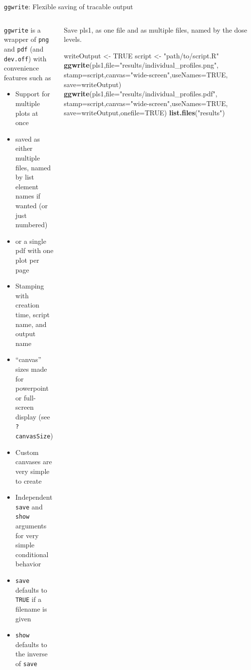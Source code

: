 \documentclass[
  8pt,
  ignorenonframetext,
  aspectratio=169]{beamer}
\newenvironment{Shaded}{\begin{snugshade}}{\end{snugshade}}
\newcommand{\DataTypeTok}[1]{\textcolor[rgb]{0.13,0.29,0.53}{#1}}
\newcommand{\KeywordTok}[1]{\textcolor[rgb]{0.13,0.29,0.53}{\textbf{#1}}}
\newcommand{\NormalTok}[1]{#1}
\newcommand{\OtherTok}[1]{\textcolor[rgb]{0.56,0.35,0.01}{#1}}
\newcommand{\StringTok}[1]{\textcolor[rgb]{0.31,0.60,0.02}{#1}}
\providecommand{\tightlist}{%
  \setlength{\itemsep}{0pt}\setlength{\parskip}{0pt}}
\begin{document}
\begin{frame}[fragile]{\texttt{ggwrite}: Flexible saving of tracable
output}
\protect\hypertarget{ggwrite-flexible-saving-of-tracable-output}{}
\begin{columns}[T]
\begin{column}{0.48\textwidth}
\texttt{ggwrite} is a wrapper of \texttt{png} and \texttt{pdf} (and
\texttt{dev.off}) with convenience features such as

\begin{itemize}
\tightlist
\item
  Support for multiple plots at once
\item
  saved as either multiple files, named by list element names if wanted
  (or just numbered)
\item
  or a single pdf with one plot per page
\item
  Stamping with creation time, script name, and output name
\item
  ``canvas'' sizes made for powerpoint or full-screen display (see
  \texttt{?canvasSize})
\item
  Custom canvases are very simple to create
\item
  Independent \texttt{save} and \texttt{show} arguments for very simple
  conditional behavior
\item
  \texttt{save} defaults to \texttt{TRUE} if a filename is given
\item
  \texttt{show} defaults to the inverse of \texttt{save}
\end{itemize}
\end{column}

\begin{column}{0.48\textwidth}
Save pls1, as one file and as multiple files, named by the dose levels.
\footnotesize

\begin{Shaded}
\begin{Highlighting}[]
\NormalTok{writeOutput \textless{}{-}}\StringTok{ }\OtherTok{TRUE}
\NormalTok{script \textless{}{-}}\StringTok{ "path/to/script.R"}
\KeywordTok{ggwrite}\NormalTok{(pls1,}\DataTypeTok{file=}\StringTok{"results/individual\_profiles.png"}\NormalTok{,}
        \DataTypeTok{stamp=}\NormalTok{script,}\DataTypeTok{canvas=}\StringTok{"wide{-}screen"}\NormalTok{,}\DataTypeTok{useNames=}\OtherTok{TRUE}\NormalTok{,}
        \DataTypeTok{save=}\NormalTok{writeOutput)}
\KeywordTok{ggwrite}\NormalTok{(pls1,}\DataTypeTok{file=}\StringTok{"results/individual\_profiles.pdf"}\NormalTok{,}
        \DataTypeTok{stamp=}\NormalTok{script,}\DataTypeTok{canvas=}\StringTok{"wide{-}screen"}\NormalTok{,}\DataTypeTok{useNames=}\OtherTok{TRUE}\NormalTok{,}
        \DataTypeTok{save=}\NormalTok{writeOutput,}\DataTypeTok{onefile=}\OtherTok{TRUE}\NormalTok{)}
\KeywordTok{list.files}\NormalTok{(}\StringTok{"results"}\NormalTok{)}
\end{Highlighting}
\end{Shaded}


\end{column}
\end{columns}
\end{frame}
\end{document}
